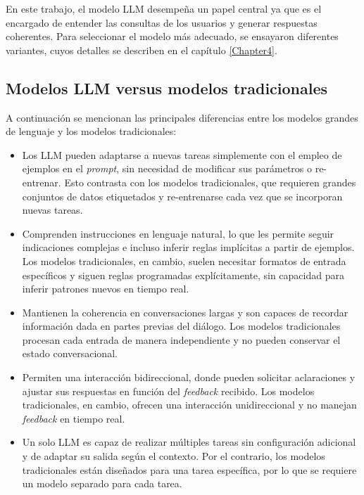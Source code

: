 \vspace{5mm}

En este trabajo, el modelo LLM desempeña un papel central ya que es el encargado de entender las consultas de 
los usuarios y generar respuestas coherentes. Para seleccionar el modelo más adecuado, 
se ensayaron diferentes variantes, cuyos detalles se describen en el capítulo \ref{Chapter4}.

\subsection{Modelos LLM versus modelos tradicionales}

A continuación se mencionan las principales diferencias entre los modelos grandes de lenguaje y los
modelos tradicionales:

\begin{itemize}
	\item Los LLM pueden adaptarse a nuevas tareas simplemente con el empleo de ejemplos en el \textit{prompt}, 
	sin necesidad de modificar sus parámetros o re-entrenar. Esto contrasta con los modelos tradicionales, 
	que requieren grandes conjuntos de datos etiquetados y re-entrenarse cada vez que se incorporan nuevas tareas.
	\item Comprenden instrucciones en lenguaje natural, lo que les permite seguir indicaciones complejas e 
	incluso inferir reglas implícitas a partir de ejemplos. Los modelos tradicionales, en cambio, suelen necesitar 
	formatos de entrada específicos y siguen reglas programadas explícitamente, sin capacidad para inferir patrones 
	nuevos en tiempo real.
	\item Mantienen la coherencia en conversaciones largas y son capaces de recordar información dada en 
	partes previas del diálogo. Los modelos tradicionales procesan cada entrada de manera independiente y no pueden 
	conservar el estado conversacional.
	\item Permiten una interacción bidireccional, donde pueden solicitar aclaraciones y ajustar sus respuestas 
	en función del \textit{feedback} recibido. Los modelos tradicionales, en cambio, ofrecen una interacción unidireccional
	y no manejan \textit{feedback} en tiempo real.
	\item Un solo LLM es capaz de realizar múltiples tareas sin configuración adicional y de adaptar su salida según 
	el contexto. Por el contrario, los modelos tradicionales están diseñados para una tarea específica, por lo que 
	se requiere un modelo separado para cada tarea.
\end{itemize}

